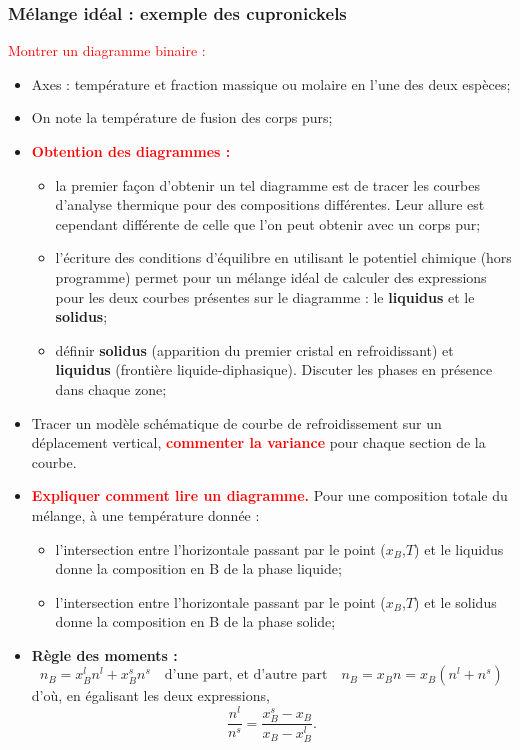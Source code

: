 \documentclass[11pt,a4paper]{report}
\begin{document}
	\subsubsection{Mélange idéal : exemple des cupronickels}
	
	\textcolor{red}{Montrer un diagramme binaire :}
	\begin{itemize}
		\item Axes : température et fraction massique ou molaire en l'une des deux espèces;
		\item On note la température de fusion des corps purs;
		\item \textbf{\textcolor{red}{Obtention des diagrammes :}}
			\begin{itemize}
			\item la premier façon d'obtenir un tel diagramme est de tracer les courbes d'analyse 					thermique pour des compositions différentes. Leur allure est cependant différente de 					celle que l'on peut obtenir avec un corps pur;
			\item l'écriture des conditions d'équilibre en utilisant le potentiel chimique (hors 					programme) permet pour un mélange idéal de calculer des expressions pour les deux     	   			courbes présentes sur le diagramme : le \textbf{liquidus} et le \textbf{solidus};
			\item définir \textbf{solidus} (apparition du premier cristal en refroidissant) et 						\textbf{liquidus} (frontière liquide-diphasique). Discuter les phases en présence dans 					chaque zone; 
			\end{itemize}
		\item Tracer un modèle schématique de courbe de refroidissement sur un déplacement vertical, 		\textbf{\textcolor{red}{commenter la variance}} pour chaque section de la courbe.\\
		
		\item \textbf{\textcolor{red}{Expliquer comment lire un diagramme.}} Pour une composition 				totale du mélange, à une température donnée :
			\begin{itemize}
			\item l'intersection entre l'horizontale passant par le point ($x_B$,$T$) et le liquidus 				donne la composition en B de la phase liquide;
			\item l'intersection entre l'horizontale passant par le point ($x_B$,$T$) et le solidus 				donne la composition en B de la phase solide;
			\end{itemize}	
		\item \textbf{Règle des moments :}
			\begin{equation}
				n_B = x_B^l n^l + x_B^s n^s \quad\text{d'une part, et d'autre part}\quad
				n_B = x_B n = x_B (n^l + n^s) 
			\end{equation}
			d'où, en égalisant les deux expressions,
			\begin{equation}
				\boxed{\frac{n^l}{n^s} = \frac{x_B^s - x_B}{x_B - x_B^l}}.
			\end{equation}				
	\end{itemize}
\end{document}
